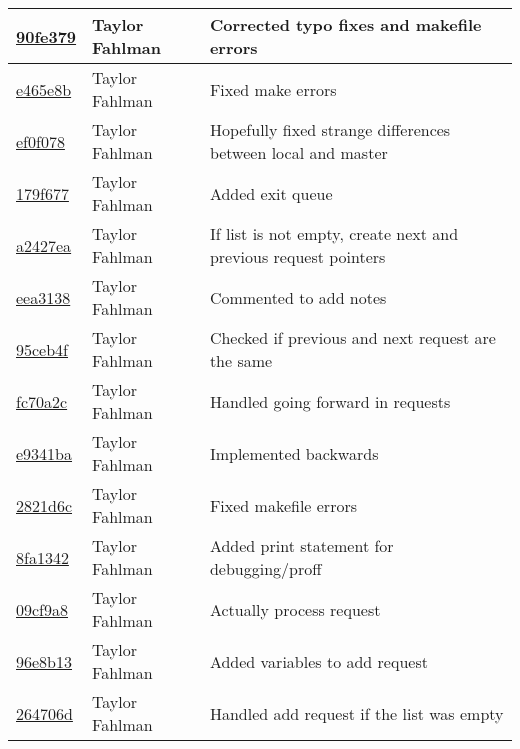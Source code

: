 \begin{tabular}{l l l}
\href{https://github.com/fahlmant/cs444/commit/90fe379dcec284aec20892a7b5dfed7418d1f629}{90fe379} & Taylor Fahlman & Corrected typo fixes and makefile errors\\\hline
\href{https://github.com/fahlmant/cs444/commit/e465e8bca4a176e46eec39c9506fcbbeaa52346d}{e465e8b} & Taylor Fahlman & Fixed make errors\\\hline
\href{https://github.com/fahlmant/cs444/commit/ef0f078626f6b3779db8239cfadefc9b0eb57422}{ef0f078} & Taylor Fahlman & Hopefully fixed strange differences between local and master\\\hline
\href{https://github.com/fahlmant/cs444/commit/179f677a63ce6e59233d66e1696cc2a2c6da4f94}{179f677} & Taylor Fahlman & Added exit queue\\\hline
\href{https://github.com/fahlmant/cs444/commit/a2427eaa94cfc72c3c636d359e1ff18729c50803}{a2427ea} & Taylor Fahlman & If list is not empty, create next and previous request pointers\\\hline
\href{https://github.com/fahlmant/cs444/commit/eea31387ddd4b439198607910a6025a957d4ce2b}{eea3138} & Taylor Fahlman & Commented to add notes\\\hline
\href{https://github.com/fahlmant/cs444/commit/95ceb4f9438107951331d241099b020416a2e580}{95ceb4f} & Taylor Fahlman & Checked if previous and next request are the same\\\hline
\href{https://github.com/fahlmant/cs444/commit/fc70a2c72e4933dbf271bf6f5b4adc250cd93f0b}{fc70a2c} & Taylor Fahlman & Handled going forward in requests\\\hline
\href{https://github.com/fahlmant/cs444/commit/e9341bad2ae0d815c1eddedcb0070bb99c3ae231}{e9341ba} & Taylor Fahlman & Implemented backwards\\\hline
\href{https://github.com/fahlmant/cs444/commit/2821d6ce67d5d1a5051838079defe48c4f14ee9f}{2821d6c} & Taylor Fahlman & Fixed makefile errors\\\hline
\href{https://github.com/fahlmant/cs444/commit/8fa13421d3f213f3e1698235bd37426b314838d6}{8fa1342} & Taylor Fahlman & Added print statement for debugging/proff\\\hline
\href{https://github.com/fahlmant/cs444/commit/09cf9a81142f457cc824439568eb4f7d0202b485}{09cf9a8} & Taylor Fahlman & Actually process request\\\hline
\href{https://github.com/fahlmant/cs444/commit/96e8b1364367fb70321afbf63863220dec0966bb}{96e8b13} & Taylor Fahlman & Added variables to add request\\\hline
\href{https://github.com/fahlmant/cs444/commit/264706d970dd72869b019450b1f75bc089303f51}{264706d} & Taylor Fahlman & Handled add request if the list was empty\\\hline

\end{tabular}
